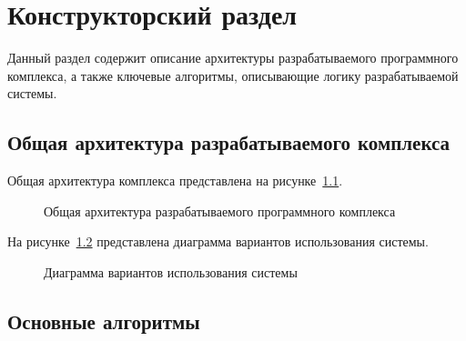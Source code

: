 \chapter{Конструкторский раздел}
Данный раздел содержит описание архитектуры разрабатываемого программного комплекса, а также ключевые алгоритмы, описывающие логику разрабатываемой системы.

\section{Общая архитектура разрабатываемого комплекса}
\label{sec:main_arch}

Общая архитектура комплекса представлена на рисунке~\ref{fig:main_arch}.

\begin{figure}
    \caption{Общая архитектура разрабатываемого программного комплекса}
    \label{fig:main_arch}
\end{figure}

На рисунке~\ref{fig:use_cases} представлена диаграмма вариантов использования системы.

\begin{figure}[htp!]
    \caption{Диаграмма вариантов использования системы}
    \label{fig:use_cases}
\end{figure}

\section{Основные алгоритмы}

